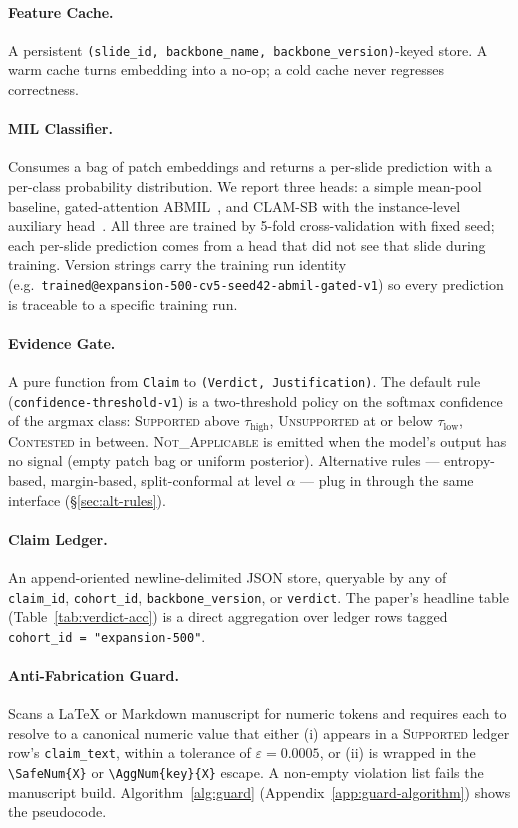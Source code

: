 \documentclass{article}
\newcommand{\SafeNum}[1]{#1}
\begin{document}
\paragraph{Feature Cache.} A persistent \texttt{(slide\_id, backbone\_name, backbone\_version)}-keyed store. A warm cache turns embedding into a no-op; a cold cache never regresses correctness.

\paragraph{MIL Classifier.} Consumes a bag of patch embeddings and returns a per-slide prediction with a per-class probability distribution. We report three heads: a simple mean-pool baseline, gated-attention ABMIL~\citep{ilse2018attention}, and CLAM-SB with the instance-level auxiliary head~\citep{lu2021clam}. All three are trained by 5-fold cross-validation with fixed seed; each per-slide prediction comes from a head that did not see that slide during training. Version strings carry the training run identity (e.g.\ \texttt{trained@expansion-500-cv5-seed42-abmil-gated-v1}) so every prediction is traceable to a specific training run.

\paragraph{Evidence Gate.} A pure function from \texttt{Claim} to \texttt{(Verdict, Justification)}. The default rule (\texttt{confidence-threshold-v1}) is a two-threshold policy on the softmax confidence of the argmax class: \textsc{Supported} above $\tau_{\text{high}}$, \textsc{Unsupported} at or below $\tau_{\text{low}}$, \textsc{Contested} in between. \textsc{Not\_Applicable} is emitted when the model's output has no signal (empty patch bag or uniform posterior). Alternative rules --- entropy-based, margin-based, split-conformal at level $\alpha$ --- plug in through the same interface (\S\ref{sec:alt-rules}).

\paragraph{Claim Ledger.} An append-oriented newline-delimited JSON store, queryable by any of \texttt{claim\_id}, \texttt{cohort\_id}, \texttt{backbone\_version}, or \texttt{verdict}. The paper's headline table (Table~\ref{tab:verdict-acc}) is a direct aggregation over ledger rows tagged \texttt{cohort\_id = "expansion-500"}.

\paragraph{Anti-Fabrication Guard.} Scans a LaTeX or Markdown manuscript for numeric tokens and requires each to resolve to a canonical numeric value that either (i) appears in a \textsc{Supported} ledger row's \texttt{claim\_text}, within a tolerance of $\varepsilon{=}\SafeNum{0.0005}$, or (ii) is wrapped in the \texttt{\textbackslash SafeNum\{X\}} or \texttt{\textbackslash AggNum\{key\}\{X\}} escape. A non-empty violation list fails the manuscript build. Algorithm~\ref{alg:guard} (Appendix~\ref{app:guard-algorithm}) shows the pseudocode.
\end{document}
